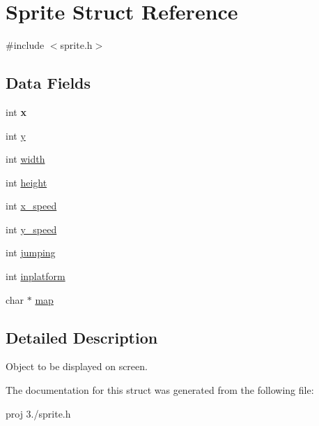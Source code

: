 \hypertarget{struct_sprite}{}\section{Sprite Struct Reference}
\label{struct_sprite}


{\ttfamily \#include $<$sprite.\+h$>$}

\subsection*{Data Fields}
\begin{DoxyCompactItemize}
\item 
\hypertarget{group__sprite_ga6150e0515f7202e2fb518f7206ed97dc}{}int {\bfseries x}\label{group__sprite_ga6150e0515f7202e2fb518f7206ed97dc}

\item 
int \hyperlink{group__sprite_ga0a2f84ed7838f07779ae24c5a9086d33}{y}
\item 
int \hyperlink{group__sprite_ga2474a5474cbff19523a51eb1de01cda4}{width}
\item 
int \hyperlink{group__sprite_gad12fc34ce789bce6c8a05d8a17138534}{height}
\item 
int \hyperlink{group__sprite_ga56d83ad8a1afb318706057c1ec72f797}{x\+\_\+speed}
\item 
int \hyperlink{group__sprite_ga081c2d7f9619a32bd806baa1831ce1c1}{y\+\_\+speed}
\item 
int \hyperlink{group__sprite_gad427edc16087f64ef18fb771dd34cc0b}{jumping}
\item 
int \hyperlink{group__sprite_ga44675e845628c15d8a696990a9494d04}{inplatform}
\item 
char $\ast$ \hyperlink{group__sprite_ga7b00b1bfd666e26484471bd17a74eaa9}{map}
\end{DoxyCompactItemize}


\subsection{Detailed Description}
Object to be displayed on screen. 

The documentation for this struct was generated from the following file\+:\begin{DoxyCompactItemize}
\item 
proj 3./sprite.\+h\end{DoxyCompactItemize}

